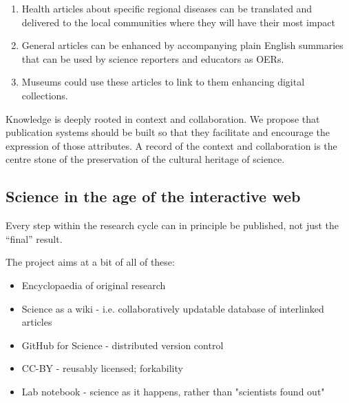 \documentclass[final,authoryear,3p]{elsarticle-open-drafting}
\begin{document}
\begin{enumerate}
\item Health articles about specific regional diseases can be translated and delivered to the local communities where they will have their most impact
\item General articles can be enhanced by accompanying plain English summaries that can be used by science reporters and educators as OERs. 
\item Museums could use these articles to link to them enhancing digital collections. 
\end{enumerate}

Knowledge is deeply rooted in context and collaboration. We propose that publication systems should be built so that they facilitate and encourage the expression of those attributes. A record of the context and collaboration is the centre stone of the preservation of the cultural heritage of science. 





\subsection{Science in the age of the interactive web}

Every step within the research cycle can in principle be published, not just the ``final'' result.

The project aims at a bit of all of these:
\begin{itemize}
	\item Encyclopaedia of original research
	\item Science as a wiki - i.e. collaboratively updatable database of interlinked articles
	\item GitHub for Science - distributed version control
	\item CC-BY - reusably licensed; forkability
	\item Lab notebook - science as it happens, rather than "scientists found out"
\end{itemize}
\end{document}
